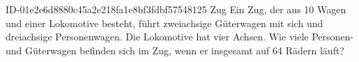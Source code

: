 \begin{exercise}
      {ID-01e2e6d8880c45a2e218fa1e8bf3fdbf57548125}
      {Zug}
  \ifproblem\problem
    Ein Zug, der aus 10 Wagen und einer Lokomotive besteht, führt zweiachsige
    Güterwagen mit sich und dreiachsige Personenwagen. Die Lokomotive hat vier
    Achsen. Wie viele Personen- und Güterwagen befinden sich im Zug, wenn
    er insgesamt auf 64 Rädern läuft?
  \fi
\end{exercise}
